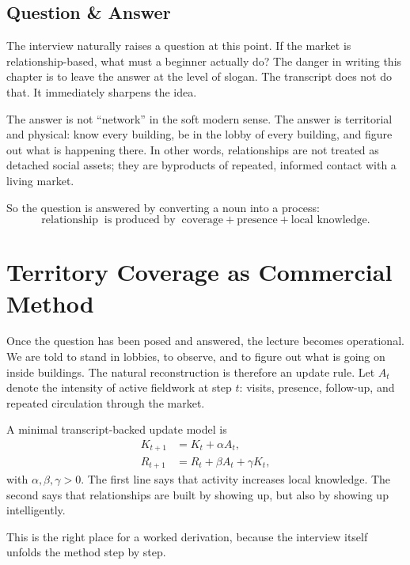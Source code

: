 \subsection{Question \& Answer}

The interview naturally raises a question at this point. If the market is relationship-based, what must a beginner actually do? The danger in writing this chapter is to leave the answer at the level of slogan. The transcript does not do that. It immediately sharpens the idea.

The answer is not ``network'' in the soft modern sense. The answer is territorial and physical: know every building, be in the lobby of every building, and figure out what is happening there. In other words, relationships are not treated as detached social assets; they are byproducts of repeated, informed contact with a living market.

So the question is answered by converting a noun into a process:
\begin{equation}
\text{relationship} \;\; \text{is produced by} \;\; \text{coverage} + \text{presence} + \text{local knowledge}.
\end{equation}

\section{Territory Coverage as Commercial Method}

Once the question has been posed and answered, the lecture becomes operational. We are told to stand in lobbies, to observe, and to figure out what is going on inside buildings. The natural reconstruction is therefore an update rule. Let \(A_t\) denote the intensity of active fieldwork at step \(t\): visits, presence, follow-up, and repeated circulation through the market.

A minimal transcript-backed update model is
\begin{align}
K_{t+1} &= K_t + \alpha A_t, \\
R_{t+1} &= R_t + \beta A_t + \gamma K_t,
\end{align}
with \(\alpha,\beta,\gamma > 0\). The first line says that activity increases local knowledge. The second says that relationships are built by showing up, but also by showing up intelligently.

This is the right place for a worked derivation, because the interview itself unfolds the method step by step.

